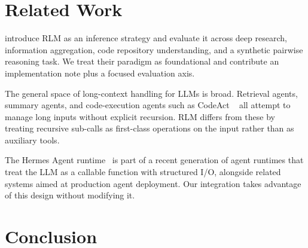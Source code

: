 \documentclass[11pt,a4paper]{article}
\begin{document}
\section{Related Work}
\label{sec:related}

\citet{zhang2025rlm} introduce RLM as an inference strategy and evaluate
it across deep research, information aggregation, code repository
understanding, and a synthetic pairwise reasoning task. We treat their
paradigm as foundational and contribute an implementation note plus a
focused evaluation axis.

The general space of long-context handling for LLMs is broad. Retrieval
agents, summary agents, and code-execution agents such as CodeAct
~\citep{wang2024codeact} all attempt to manage long inputs without
explicit recursion. RLM differs from these by treating recursive
sub-calls as first-class operations on the input rather than as
auxiliary tools.

The Hermes Agent runtime~\citep{nous2025hermes} is part of a recent
generation of agent runtimes that treat the LLM as a callable function
with structured I/O, alongside related systems aimed at production
agent deployment. Our integration takes advantage of this design without
modifying it.

\section{Conclusion}
\label{sec:conclusion}
\end{document}
